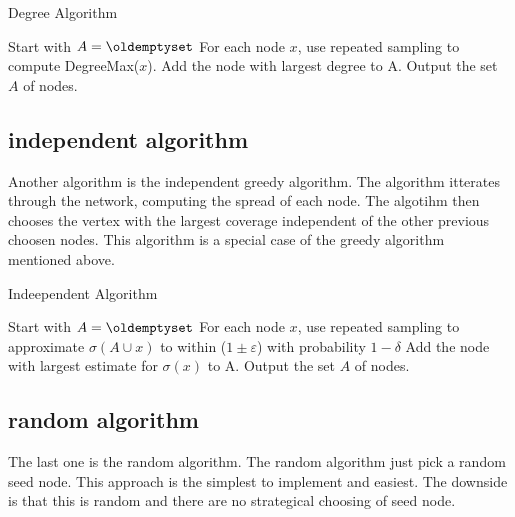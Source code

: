 {\begin{algorithm}
\caption{Degree Algorithm}
\begin{algorithmic}[1]
\State Start with $A = \oldemptyset$
\State For each node $x$, use repeated sampling to compute DegreeMax($x$).
\State Add the node with largest degree to A.
\EndWhile
\State Output the set $A$ of nodes.
\end{algorithmic}
\end{algorithm}

\subsection{independent algorithm}
Another algorithm is the independent greedy algorithm. The algorithm itterates through the network, computing the spread of each node. The algotihm then chooses the vertex with the largest coverage independent of the other previous choosen nodes. This algorithm is a special case of the greedy algorithm mentioned above.

\begin{algorithm}
\caption{Indeependent Algorithm}
\begin{algorithmic}[1]
\State Start with $A = \oldemptyset$
\State For each node $x$, use repeated sampling to approximate $\sigma(A \cup {x}) $ to within ($1 \pm \varepsilon$) with probability
$1 − \delta$
\State Add the node with largest estimate for $\sigma({x})$ to A.
\EndWhile
\State Output the set $A$ of nodes.
\end{algorithmic}
\end{algorithm}


\subsection{random algorithm}
The last one is the random algorithm. The random algorithm just pick a random seed node. This approach is the simplest to implement and easiest. The downside is that this is random and there are no strategical choosing of seed node. 



}

